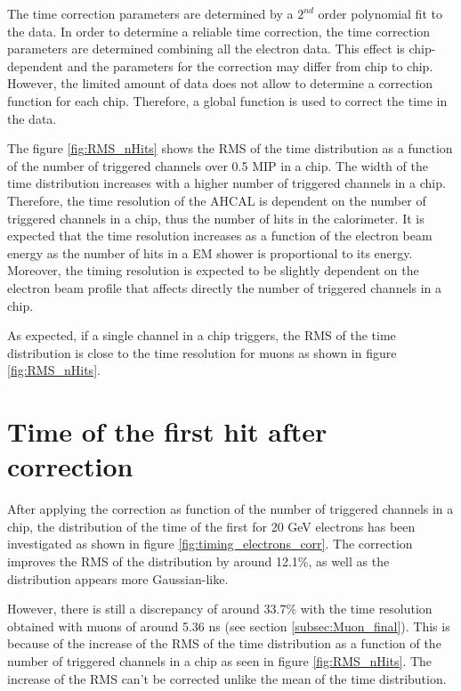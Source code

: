 The time correction parameters are determined by a $2^{nd}$ order polynomial fit to the data. In order to determine a reliable time correction, the time correction parameters are determined combining all the electron data. This effect is chip-dependent and the parameters for the correction may differ from chip to chip. However, the limited amount of data does not allow to determine a correction function for each chip. Therefore, a global function is used to correct the time in the data.

The figure \ref{fig:RMS_nHits} shows the RMS of the time distribution as a function of the number of triggered channels over 0.5 MIP in a chip. The width of the time distribution increases with a higher number of triggered channels in a chip. Therefore, the time resolution of the AHCAL is dependent on the number of triggered channels in a chip, thus the number of hits in the calorimeter. It is expected that the time resolution increases as a function of the electron beam energy as the number of hits in a EM shower is proportional to its energy. Moreover, the timing resolution is expected to be slightly dependent on the electron beam profile that affects directly the number of triggered channels in a chip.

As expected, if a single channel in a chip triggers, the RMS of the time distribution is close to the time resolution for muons as shown in figure \ref{fig:RMS_nHits}.

\section{Time of the first hit after correction}
\label{subsec:Electron_Final}

After applying the correction as function of the number of triggered channels in a chip, the distribution of the time of the first for 20 GeV electrons has been investigated as shown in figure \ref{fig:timing_electrons_corr}. The correction improves the RMS of the distribution by around 12.1\%, as well as the distribution appears more Gaussian-like.

However, there is still a discrepancy of around 33.7\% with the time resolution obtained with muons of around 5.36 ns (see section \ref{subsec:Muon_final}). This is because of the increase of the RMS of the time distribution as a function of the number of triggered channels in a chip as seen in figure \ref{fig:RMS_nHits}. The increase of the RMS can't be corrected unlike the mean of the time distribution.

